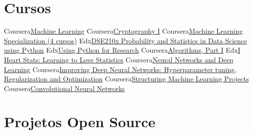 \documentclass[11pt,a4paper,sans]{moderncv}        %
\begin{document}
\section{Cursos}
\cvdoubleitem
  {Coursera}{\href{https://www.coursera.org/account/accomplishments/verify/CWFKK68KQP9X}{\small{Machine Learning}}}
  {Coursera}{\href{https://www.coursera.org/api/legacyCertificates.v1/spark/statementOfAccomplishment/976353~15102768/pdf}{\small{Cryptography I}}}
\cvdoubleitem
  {Coursera}{\href{https://www.coursera.org/account/accomplishments/specialization/YHKBDQ77K2GB}{\small{Machine Learning Specialization (4 cursos)}}}
  {Edx}{\href{https://www.edx.org/course/probability-and-statistics-in-data-science-using-python}{\small{DSE210x Probability and Statistics in Data Science using Python}}}
\cvdoubleitem
  {Edx}{\href{https://www.edx.org/course/using-python-for-research}{\small{Using Python for Research}}}
  {Coursera}{\href{https://www.coursera.org/learn/algorithms-part1}{\small{Algorithms, Part I}}}
\cvdoubleitem
  {Edx}{\href{https://www.edx.org/course/i-heart-stats-learning-love-statistics-notredamex-soc120x}{\scriptsize{I Heart Stats: Learning to Love Statistics}}}
  {Coursera}{\href{https://www.coursera.org/account/accomplishments/verify/RY4DLN2Q6MW3}{\footnotesize{Neural Networks and Deep Learning}}}
\cvdoubleitem
  {Coursera}{\href{https://www.coursera.org/account/accomplishments/verify/6SEWP83D96QM}{\small{Improving Deep Neural Networks: Hyperparameter tuning, Regularization and Optimization}}}
  {Coursera}{\href{https://www.coursera.org/account/accomplishments/verify/BBTE8KJC6WRU}{\footnotesize{Structuring Machine Learning Projects}}}
\cvdoubleitem
  {Coursera}{\href{https://www.coursera.org/account/accomplishments/verify/5A8K3WTQHAZF}{\small{Convolutional Neural Networks}}}
  {}{}

\section{Projetos Open Source}
\end{document}
